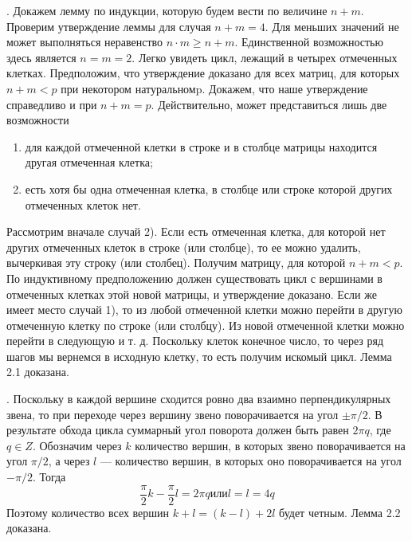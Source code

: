 . Докажем лемму по индукции, которую будем вести по величине $n + m$. Проверим утверждение леммы для случая $n + m = 4$. Для меньших значений не может выполняться неравенство $n\cdot m \ge n+m$. Единственной возможностью здесь является $n = m = 2$. Легко увидеть цикл, лежащий в четырех отмеченных клетках. Предположим, что утверждение доказано для всех матриц, для которых $n + m < p$ при некотором натуральномp. Докажем, что наше утверждение справедливо и при $n + m =  p$. Действительно, может представиться лишь две возможности

\begin{enumerate}
\renewcommand{\labelenumi}{\theenumi)}
\item для каждой отмеченной клетки в строке и в столбце матрицы находится другая отмеченная клетка;
\item есть хотя бы одна отмеченная клетка, в столбце или строке которой других отмеченных клеток нет.
\end{enumerate}

Рассмотрим вначале случай 2). Если есть отмеченная клетка, для которой нет других отмеченных клеток в строке (или столбце), то ее можно удалить, вычеркивая эту строку (или столбец). Получим матрицу, для которой $n + m < p$. По индуктивному предположению должен существовать цикл с вершинами в отмеченных клетках этой новой матрицы, и утверждение доказано. Если же имеет место случай 1), то из любой отмеченной клетки можно перейти в другую отмеченную клетку по строке (или столбцу). Из новой отмеченной клетки можно перейти в следующую и т. д. Поскольку клеток конечное число, то через ряд шагов мы вернемся в исходную клетку, то есть получим искомый цикл. Лемма 2.1 доказана. %


. Поскольку в каждой вершине сходится ровно два взаимно перпендикулярных звена, то при переходе через вершину звено поворачивается на угол $\pm \pi/2$. В результате обхода цикла суммарный угол поворота должен быть равен $2\pi q$, где $q\in Z$. Обозначим через $k$ количество вершин, в которых звено поворачивается на угол $\pi/2$, а через $l$ — количество вершин, в которых оно поворачивается на угол  $-\pi/2$. Тогда
$$\frac{\pi}{2}k - \frac{\pi}{2}l = 2\pi q     или     l = l = 4q$$
Поэтому количество всех вершин $k + l = (k - l) + 2l$ будет четным. Лемма 2.2 доказана.%


